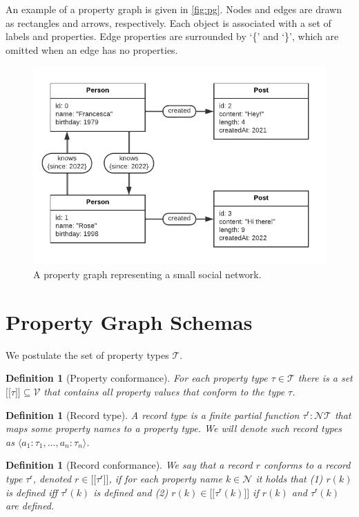 \documentclass{article}
\makeatletter
\newtheorem{definition}[theorem]{Definition}
\newcommand{\pto}{}%
\DeclareRobustCommand{\pto}{\mathrel{\mathpalette\p@to@gets\to}}
\newcommand{\p@to@gets}[2]{%
  \ooalign{\hidewidth$\m@th#1\mapstochar\mkern5mu$\hidewidth\cr$\m@th#1\to$\cr}%
}
\newcommand{\ptype}{\tau}
\newcommand{\ptypes}{\mathcal{T}}
\newcommand{\rtype}{\tau^\mathsf{r}}
\newcommand{\lsem}{\ensuremath{[\![}}
\newcommand{\rsem}{\ensuremath{]\!]}}
\newcommand{\sem}[1]{\ensuremath{\lsem #1 \rsem}}
\makeatother
\begin{document}
An example of a property graph is given in \autoref{fig:pg}. Nodes and edges are drawn as rectangles and arrows, respectively. Each object is associated with a set of labels and properties. Edge properties are surrounded by `\{' and `\}', which are omitted when an edge has no properties.

\begin{figure}[t]
  \centering
  \includegraphics{figures/pg.pdf}
  \caption{A property graph representing a small social network.}
  \label{fig:pg}
\end{figure}

\section{Property Graph Schemas}

We postulate the set of property types $\mathcal{T}$.

\begin{definition}[Property conformance]
  For each property type $\ptype \in \ptypes$ there is a set $\sem{\ptype} \subseteq \mathcal{V}$ that contains all property values that \emph{conform} to the type $\ptype$.
\end{definition}

\begin{definition}[Record type]
  A \emph{record type} is a finite partial function $\rtype : \mathcal{N} \pto \ptypes$ that maps some property names to a property type.
  We will denote such record types as $\langle a_1 : \ptype_1, \ldots, a_n : \ptype_n \rangle$.
\end{definition}

\begin{definition}[Record conformance]
  We say that a record $r$ \emph{conforms} to a record type $\rtype$, denoted $r \in \sem{\rtype}$, if for each property name $k \in \mathcal{N}$ it holds that (1) $r(k)$ is defined iff $\rtype(k)$ is defined and (2) $r(k) \in \sem{\rtype(k)}$ if $r(k)$ and $\rtype(k)$ are defined.
\end{definition}
\end{document}
